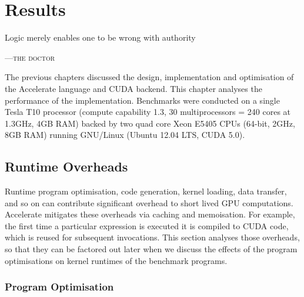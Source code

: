 %
%

\chapter{Results}
\label{ch:results}


\epigraph{Logic merely enables one to be wrong with authority}%
{\textsc{---the doctor}} %


The previous chapters discussed the design, implementation and optimisation of
the Accelerate language and CUDA backend. This chapter analyses the performance
of the implementation. Benchmarks were conducted on a single Tesla T10 processor
(compute capability 1.3, 30 multiprocessors = 240 cores at 1.3GHz, 4GB RAM)
backed by two quad core Xeon E5405 CPUs (64-bit, 2GHz, 8GB RAM) running
GNU/Linux (Ubuntu 12.04 LTS, CUDA 5.0).


\section{Runtime Overheads}

Runtime program optimisation, code generation, kernel loading, data transfer,
and so on can contribute significant overhead to short lived GPU computations.
Accelerate mitigates these overheads via caching and memoisation. For example,
the first time a particular expression is executed it is compiled to CUDA code,
which is reused for subsequent invocations. This section analyses those
overheads, so that they can be factored out later when we discuss the effects of
the program optimisations on kernel runtimes of the benchmark programs.


\subsection{Program Optimisation}


